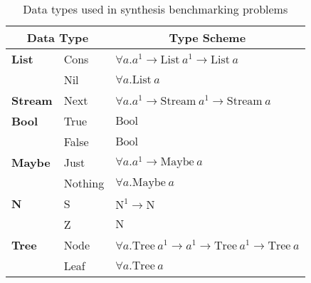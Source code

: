 \begin{table}[H]
    \begin{center}
        \begin{tabular}{p{4.25em}l|l}
            \hline \multicolumn{2}{c}{{Data Type}} & \multicolumn{1}{|c}{Type Scheme} \\ \hline
\hline \textbf{List} &
        Cons      & $\forall a . a^{1} \rightarrow \text{List}\ a^{1} \rightarrow \text{List}\ a$\\ &
        Nil       & $\forall a . \text{List}\ a$ \\
\hline \textbf{Stream} &
        Next      & $\forall a . a^{1} \rightarrow \text{Stream}\ a^{1} \rightarrow \text{Stream}\ a$ \\
\hline \textbf{Bool} &
        True      & $ \text{Bool} $ \\ &
        False     & $ \text{Bool} $ \\
\hline \textbf{Maybe} &
        Just      & $ \forall a . a^{1} \rightarrow \text{Maybe}\ a $ \\ &
        Nothing   & $ \forall a . \text{Maybe}\ a $ \\
\hline \textbf{N} &
        S         & $ \text{N}^{1} \rightarrow \text{N} $ \\ &
        Z         & $ \text{N} $ \\
\hline \textbf{Tree} &
        Node      & $ \forall a . \text{Tree}\ a^{1} \rightarrow a^{1} \rightarrow \text{Tree}\ a^{1} \rightarrow \text{Tree}\ a$ \\ &
        Leaf      & $ \forall a . \text{Tree}\ a $ \\
        \end{tabular}
    \end{center}
\caption{Data types used in synthesis benchmarking problems}
\label{tab:datatypes}
\end{table}

